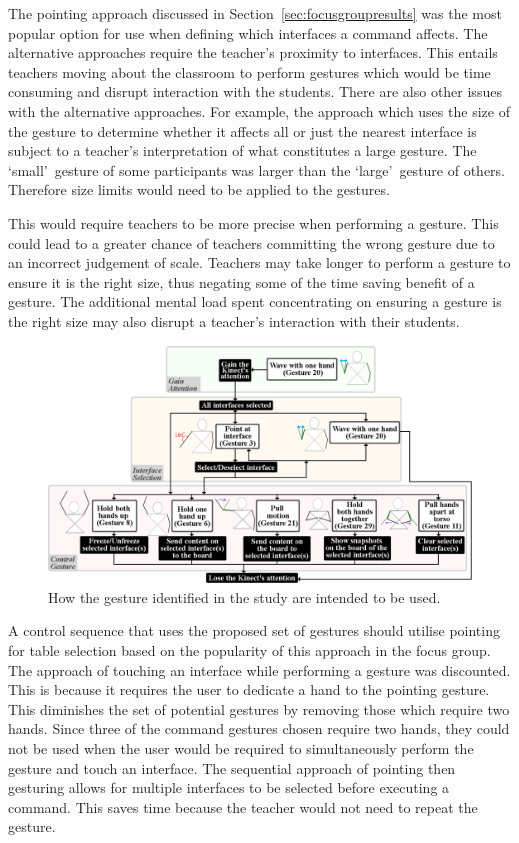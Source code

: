 \documentclass[manuscript, review, screen]{acmart}
\begin{document}
The pointing approach discussed in Section~\ref{sec:focusgroupresults} was the most popular option for use when defining which interfaces a command affects.
The alternative approaches require the teacher's proximity to interfaces.
This entails teachers moving about the classroom to perform gestures which would be time consuming and disrupt interaction with the students.
There are also other issues with the alternative approaches.
For example, the approach which uses the size of the gesture to determine whether it affects all or just the nearest interface is subject to a teacher's interpretation of what constitutes a large gesture.
The \lq small\rq\ gesture of some participants was larger than the \lq large\rq\ gesture of others.
Therefore size limits would need to be applied to the gestures.

This would require teachers to be more precise when performing a gesture.
This could lead to a greater chance of teachers committing the wrong gesture due to an incorrect judgement of scale.
Teachers may take longer to perform a gesture to ensure it is the right size, thus negating some of the time saving benefit of a gesture.
The additional mental load spent concentrating on ensuring a gesture is the right size may also disrupt a teacher's interaction with their students.

\begin{figure}[t]
   \centering
   \includegraphics[width=1\textwidth]{figures/control_flow.png}
   \caption{How the gesture identified in the study are intended to be used.}
   \label{fig:flow}
\end{figure}

A control sequence that uses the proposed set of gestures should utilise pointing for table selection based on the popularity of this approach in the focus group.
The approach of touching an interface while performing a gesture was discounted.  
This is because it requires the user to dedicate a hand to the pointing gesture.  
This diminishes the set of potential gestures by removing those which require two hands.
Since three of the command gestures chosen require two hands, they could not be used when the user would be required to simultaneously perform the gesture and touch an interface.
The sequential approach of pointing then gesturing allows for multiple interfaces to be selected before executing a command.
This saves time because the teacher would not need to repeat the gesture.
\end{document}
